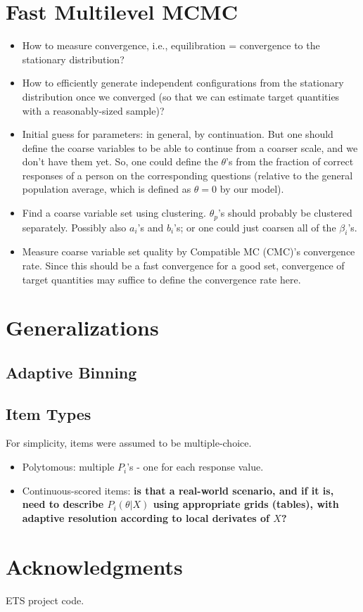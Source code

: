 \documentclass{article}
\newcommand{\ta}{\theta}
\begin{document}
\section{Fast Multilevel MCMC}
\begin{itemize}
	\item How to measure convergence, i.e., equilibration = convergence to the stationary distribution? 
	\item How to efficiently generate independent configurations from the stationary distribution once we converged
	(so that we can estimate target quantities with a reasonably-sized sample)?
	\item Initial guess for parameters: in general, by continuation. But one should define the coarse variables
	to be able to continue from a coarser scale, and we don't have them yet. So, one could define the $\ta$'s
	from the fraction of correct responses of a person on the corresponding questions (relative to the general
	population average, which is defined as $\ta=0$ by our model).
	\item Find a coarse variable set using clustering. $\ta_p$'s should probably be clustered separately. 	Possibly also $a_i$'s and $b_i$'s; or one could just coarsen all of the $\beta_i$'s.
	\item Measure coarse variable set quality by Compatible MC (CMC)'s convergence rate. Since this should be a fast convergence for a good set, convergence of target quantities may suffice to define the convergence rate here.
\end{itemize}

\section{Generalizations}
\label{general}

\subsection{Adaptive Binning}
\label{adaptive_grid}

\subsection{Item Types}
For simplicity, items were assumed to be multiple-choice.
\begin{itemize}
	\item Polytomous: multiple $P_i$'s - one for each response value.
	\item Continuous-scored items: {\bf is that a real-world scenario, and if it is, 
	need to describe $P_i(\theta|X)$ using appropriate grids (tables), with adaptive resolution
	according to local derivates of $X$?}
\end{itemize}

\section{Acknowledgments}
ETS project code.



\end{document}
